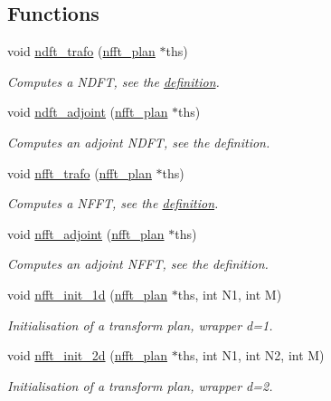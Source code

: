 \subsection*{Functions}
\begin{CompactItemize}
\item 
void \hyperlink{group__nfft_ga0}{ndft\_\-trafo} (\hyperlink{structnfft__plan}{nfft\_\-plan} $\ast$ths)
\begin{CompactList}\small\item\em Computes a NDFT, see the \hyperlink{group__nfft_ndft_formula}{definition}. \item\end{CompactList}\item 
void \hyperlink{group__nfft_ga1}{ndft\_\-adjoint} (\hyperlink{structnfft__plan}{nfft\_\-plan} $\ast$ths)
\begin{CompactList}\small\item\em Computes an adjoint NDFT, see the definition. \item\end{CompactList}\item 
void \hyperlink{group__nfft_ga2}{nfft\_\-trafo} (\hyperlink{structnfft__plan}{nfft\_\-plan} $\ast$ths)
\begin{CompactList}\small\item\em Computes a NFFT, see the \hyperlink{group__nfft_ndft_formula}{definition}. \item\end{CompactList}\item 
void \hyperlink{group__nfft_ga3}{nfft\_\-adjoint} (\hyperlink{structnfft__plan}{nfft\_\-plan} $\ast$ths)
\begin{CompactList}\small\item\em Computes an adjoint NFFT, see the definition. \item\end{CompactList}\item 
void \hyperlink{group__nfft_ga4}{nfft\_\-init\_\-1d} (\hyperlink{structnfft__plan}{nfft\_\-plan} $\ast$ths, int N1, int M)
\begin{CompactList}\small\item\em Initialisation of a transform plan, wrapper d=1. \item\end{CompactList}\item 
void \hyperlink{group__nfft_ga5}{nfft\_\-init\_\-2d} (\hyperlink{structnfft__plan}{nfft\_\-plan} $\ast$ths, int N1, int N2, int M)
\begin{CompactList}\small\item\em Initialisation of a transform plan, wrapper d=2. \item\end{CompactList}\item 

\end{CompactItemize}
